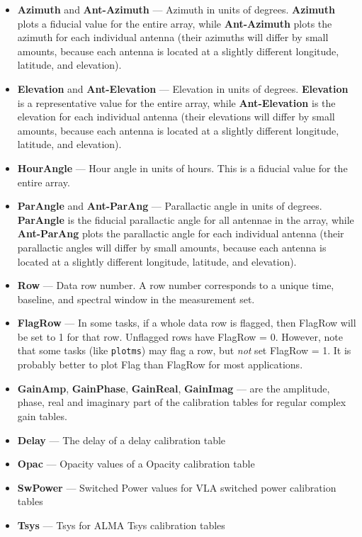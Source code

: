\begin{itemize}
\item {\bf Azimuth} and {\bf Ant-Azimuth} --- Azimuth in units of degrees. {\bf Azimuth} plots a fiducial value for the entire array, while {\bf Ant-Azimuth} plots the azimuth for each individual antenna (their azimuths will differ by small amounts, because each antenna is located at a slightly different longitude, latitude, and elevation).

\item {\bf Elevation} and {\bf Ant-Elevation} --- Elevation in units
  of degrees. {\bf Elevation} is a representative value for the entire
  array, while {\bf Ant-Elevation} is the elevation for each
  individual antenna (their elevations will differ by small amounts,
  because each antenna is located at a slightly different longitude,
  latitude, and elevation).

\item {\bf HourAngle} --- Hour angle in units of hours. This is a fiducial value for the entire array.

\item {\bf ParAngle} and {\bf Ant-ParAng} --- Parallactic angle in
  units of degrees. {\bf ParAngle} is the fiducial parallactic angle
  for all antennae in the array, while {\bf Ant-ParAng} plots the
  parallactic angle for each individual antenna (their parallactic
  angles will differ by small amounts, because each antenna is located
  at a slightly different longitude, latitude, and elevation).

\item {\bf Row} --- Data row number. A row number corresponds to a
  unique time, baseline, and spectral window in the measurement set.

\item {\bf FlagRow} --- In some tasks, if a whole data row is flagged,
  then FlagRow will be set to 1 for that row. Unflagged rows have
  FlagRow = 0. However, note that some tasks (like {\tt plotms}) may
  flag a row, but {\it not} set FlagRow = 1. It is probably better to
  plot Flag than FlagRow for most applications.

\item {\bf GainAmp}, {\bf GainPhase}, {\bf GainReal}, {\bf GainImag} ---
  are the amplitude, phase, real and imaginary part of the calibration
  tables for regular complex gain tables. 

\item {\bf Delay} --- The delay of a delay calibration table

\item {\bf Opac} --- Opacity values of a Opacity calibration table

\item {\bf SwPower} --- Switched Power values for VLA switched power
  calibration tables

\item {\bf Tsys} --- Tsys for ALMA Tsys calibration tables

\end{itemize}

